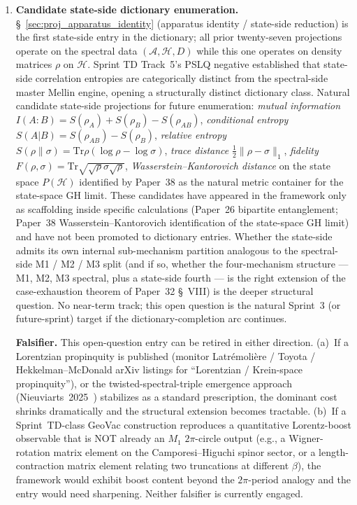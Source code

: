 \documentclass[11pt]{article}
\begin{document}
\begin{enumerate}
\item \textbf{Candidate state-side dictionary enumeration.}
\S~\ref{sec:proj_apparatus_identity} (apparatus identity / state-side
reduction) is the first state-side entry in the dictionary; all
prior twenty-seven projections operate on the spectral data
$(\mathcal{A}, \mathcal{H}, D)$ while this one operates on density
matrices $\rho$ on $\mathcal{H}$.  Sprint TD Track~5's PSLQ negative
established that state-side correlation entropies are categorically
distinct from the spectral-side master Mellin engine, opening a
structurally distinct dictionary class.  Natural candidate
state-side projections for future enumeration:
\emph{mutual information} $I(A{:}B) = S(\rho_A) + S(\rho_B) - S(\rho_{AB})$,
\emph{conditional entropy} $S(A|B) = S(\rho_{AB}) - S(\rho_B)$,
\emph{relative entropy} $S(\rho \| \sigma) = \mathrm{Tr}\rho(\log\rho
- \log\sigma)$,
\emph{trace distance} $\tfrac{1}{2}\|\rho - \sigma\|_1$,
\emph{fidelity} $F(\rho, \sigma) = \mathrm{Tr}\sqrt{\sqrt{\rho}\sigma\sqrt{\rho}}$,
\emph{Wasserstein--Kantorovich distance} on the state space
$P(\mathcal{H})$ identified by Paper~38 as the natural metric
container for the state-space GH limit.  These candidates have appeared
in the framework only as scaffolding inside specific calculations
(Paper~26 bipartite entanglement; Paper~38 Wasserstein--Kantorovich
identification of the state-space GH limit) and have not been promoted
to dictionary entries.  Whether the state-side admits its own
internal sub-mechanism partition analogous to the spectral-side M1 /
M2 / M3 split (and if so, whether the four-mechanism structure ---
M1, M2, M3 spectral, plus a state-side fourth --- is the right
extension of the case-exhaustion theorem of Paper~32 \S~VIII) is the
deeper structural question.  No near-term track; this open question
is the natural Sprint~3 (or future-sprint) target if the
dictionary-completion arc continues.

\textbf{Falsifier.}  This open-question entry can be retired in
either direction.  (a)~If a Lorentzian propinquity is published
(monitor Latr\'emoli\`ere / Toyota / Hekkelman--McDonald arXiv
listings for ``Lorentzian / Krein-space propinquity''), or the
twisted-spectral-triple emergence approach
(Nieuviarts~2025~\cite{nieuviarts2025a,nieuviarts2025b})
stabilizes as a standard prescription, the dominant cost shrinks
dramatically and the structural extension becomes tractable.
(b)~If a Sprint~TD-class GeoVac construction reproduces a
quantitative Lorentz-boost observable that is NOT already an $M_1$
$2\pi$-circle output (e.g., a Wigner-rotation matrix element on the
Camporesi--Higuchi spinor sector, or a length-contraction
matrix element relating two truncations at different $\beta$), the
framework would exhibit boost content beyond the $2\pi$-period analogy
and the entry would need sharpening.  Neither falsifier is
currently engaged.


\end{enumerate}
\end{document}
